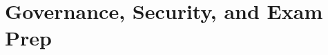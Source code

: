 \documentclass[11pt,a4paper,oneside]{book}
\begin{document}
\part{Governance, Security, and Exam Prep}





\appendix








\backmatter



\printindex
\end{document}
